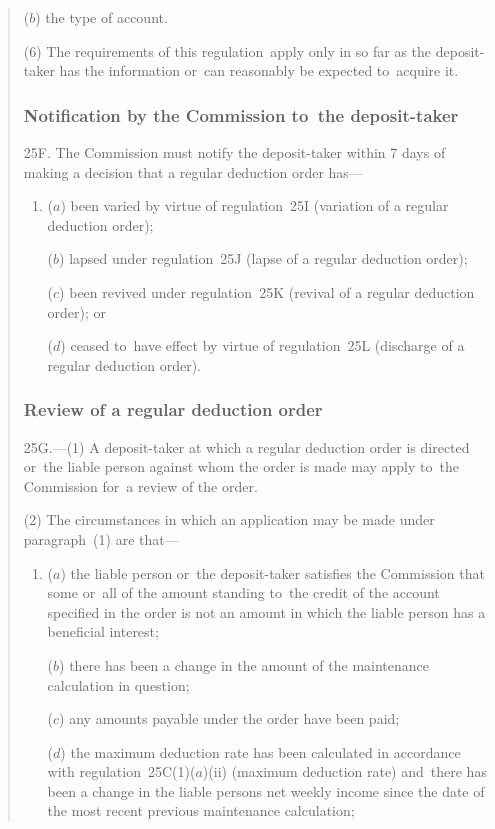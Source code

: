\documentclass[12pt,a4paper]{article}
\begin{document}
\begin{quotation}
\begin{enumerate}
($b$) the type of account.
\end{enumerate}

(6) The requirements of this regulation~apply only in so far as the deposit-taker has the information or~can reasonably be expected to~acquire it.

\subsubsection*{Notification by the Commission to~the deposit-taker}

25F.  The Commission must notify the deposit-taker within 7 days of making a decision that a regular deduction order has—
\begin{enumerate}\item[]
($a$) been varied by virtue of regulation~25I (variation of a regular deduction order);

($b$) lapsed under regulation~25J (lapse of a regular deduction order);

($c$) been revived under regulation~25K (revival of a regular deduction order); or

($d$) ceased to~have effect by virtue of regulation~25L (discharge of a regular deduction order).
\end{enumerate}

\subsubsection*{Review of a regular deduction order}

25G.---(1)  A deposit-taker at which a regular deduction order is directed or~the liable person against whom the order is made may apply to~the Commission for~a review of the order.

(2) The circumstances in which an application may be made under paragraph~(1) are that—
\begin{enumerate}\item[]
($a$) the liable person or~the deposit-taker satisfies the Commission that some or~all of the amount standing to~the credit of the account specified in the order is not an amount in which the liable person has a beneficial interest;

($b$) there has been a change in the amount of the maintenance calculation in question;

($c$) any amounts payable under the order have been paid;

($d$) the maximum deduction rate has been calculated in accordance with regulation~25C(1)($a$)(ii)  (maximum deduction rate) and~there has been a change in the liable persons net weekly income since the date of the most recent previous maintenance calculation;


\end{enumerate}
\end{quotation}
\end{document}
